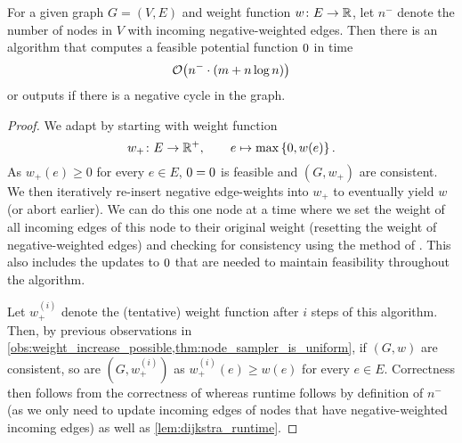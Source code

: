 \begin{theorem}\label{thm:det_pot_computation}
  For a given graph $G = (V,E)$ and weight function $w\colon E \to \mathbb R$, let $n^-$ denote the number of nodes in $V$ with incoming negative-weighted edges. 
  Then there is an algorithm that computes a feasible potential function $\pot$ in time \[
    \mathcal O\!\left(n^- \cdot (m + n\log n)\right)
  \] or outputs \negcycle if there is a negative cycle in the graph.
\end{theorem}
\begin{proof}
  We adapt \algns by starting with weight function \[
    w_+\colon E \to \mathbb{R}^+, \qquad e \mapsto \max\left\{0, w(e)\right\}. 
  \] 
  As $w_+(e) \geq 0$ for every $e \in E$, $\pot = 0$ is feasible and $(G,w_+)$ are consistent.
  We then iteratively re-insert negative edge-weights into $w_+$ to eventually yield $w$ (or abort earlier).
  We can do this one node at a time where we set the weight of all incoming edges of this node to their original weight (\ie resetting the weight of negative-weighted edges) and checking for consistency using the method of \algns.
  This also includes the updates to $\pot$ that are needed to maintain feasibility throughout the algorithm.

  Let $w_+^{(i)}$ denote the (tentative) weight function after $i$ steps of this algorithm.
  Then, by previous observations in \cref{obs:weight_increase_possible,thm:node_sampler_is_uniform}, if $(G,w)$ are consistent, so are $(G,w_+^{(i)})$ as $w_+^{(i)}(e) \geq w(e)$ for every $e \in E$.
  Correctness then follows from the correctness of \algns whereas runtime follows by definition of $n^-$ (as we only need to update incoming edges of nodes that have negative-weighted incoming edges) as well as \cref{lem:dijkstra_runtime}.
\end{proof}

